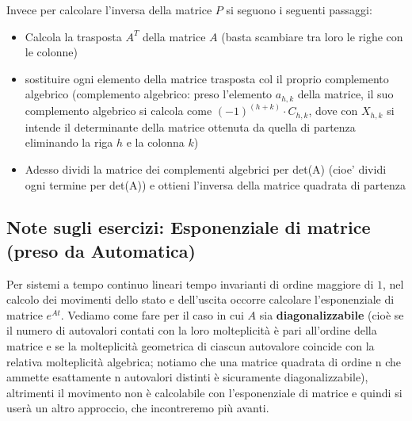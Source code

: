 \newline
Invece per calcolare l'inversa della matrice $P$ si seguono i seguenti passaggi:
\begin{itemize}
    \item Calcola la trasposta $A^T$ della matrice $A$ (basta scambiare tra loro le righe con le colonne)
    \item sostituire ogni elemento della matrice trasposta col il proprio complemento algebrico (complemento algebrico: preso l'elemento $a_{h,k}$ della matrice, il suo complemento algebrico si calcola come $(-1)^{(h+k)}\cdot C_{h,k}$, dove con $X_{h,k}$ si intende il determinante della matrice ottenuta da quella di partenza eliminando la riga $h$ e la colonna $k$)
    \item Adesso dividi la matrice dei complementi algebrici per det(A) (cioe' dividi ogni termine per det(A)) e ottieni l'inversa della matrice quadrata di partenza
\end{itemize}
\subsection{Note sugli esercizi: Esponenziale di matrice (preso da Automatica)}
Per sistemi a tempo continuo lineari tempo invarianti di ordine maggiore di $1$, nel calcolo dei movimenti dello stato e dell'uscita occorre calcolare l'esponenziale di matrice $e^{At}$.\newline
\newline
Vediamo come fare per il caso in cui $A$ sia \textbf{diagonalizzabile} (cioè se il numero di autovalori contati con la loro molteplicità è pari all'ordine della matrice e se la molteplicità geometrica di ciascun autovalore coincide con la relativa molteplicità algebrica; notiamo che una matrice quadrata di ordine n che ammette esattamente n autovalori distinti è sicuramente diagonalizzabile), altrimenti il movimento non è calcolabile con l'esponenziale di matrice e quindi si userà un altro approccio, che incontreremo più avanti.
